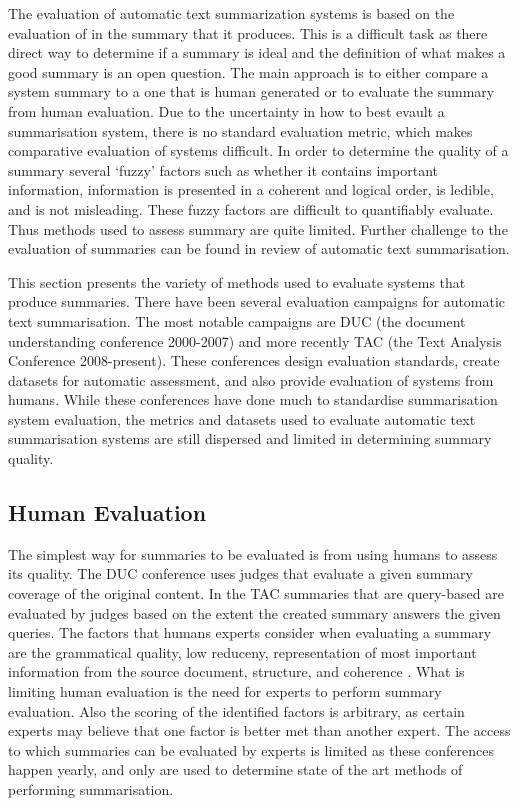 The evaluation of automatic text summarization systems is based on the evaluation of in the summary that it produces. This is a difficult task as there direct way to determine if a summary is ideal and the definition of what makes a good summary is an open question. The main approach is to either compare a system summary to a one that is human generated or to evaluate the summary from human evaluation. Due to the uncertainty in how to best evault a summarisation system, there is no standard evaluation metric, which makes comparative evaluation of systems difficult. In order to determine the quality of a summary several ‘fuzzy’ factors such as whether it contains important information, information is presented in a coherent and logical order, is ledible, and is not misleading. These fuzzy factors are difficult to quantifiably evaluate. Thus methods used to assess summary are quite limited.  Further challenge to the evaluation of summaries can be found in \citet{oruasan2019automatic} review of automatic text summarisation.

This section presents the variety of methods used to evaluate systems that produce summaries. There have been several evaluation campaigns for automatic text summarisation. The most notable campaigns are DUC (the document understanding conference 2000-2007) and more recently TAC (the Text Analysis Conference 2008-present). These conferences design evaluation standards, create datasets for automatic assessment, and also provide evaluation of systems from humans. While these conferences have done much to standardise summarisation system evaluation, the metrics and datasets used to evaluate automatic text summarisation systems are still dispersed and limited in determining summary quality.

\subsection{Human Evaluation}
\label{subsec:2.5.1}
The simplest way for summaries to be evaluated is from using humans to assess its quality.  The DUC conference uses judges that evaluate a given summary coverage of the original content. In the TAC summaries that are query-based are evaluated by judges based on the extent the created summary answers the given queries. The factors that humans experts consider when evaluating a summary are the grammatical quality, low reduceny, representation of most important information from the source document, structure, and coherence \citep{saggion2013automatic}. What is limiting human evaluation is the need for experts to perform summary evaluation. Also the scoring of the identified factors is arbitrary, as certain experts may believe that one factor is better met than another expert. The access to which summaries can be evaluated by experts is limited as these conferences happen yearly, and only are used to determine state of the art methods of performing summarisation.

